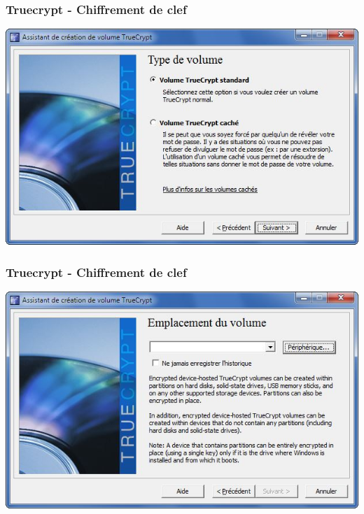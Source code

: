 \documentclass{beamer}
\begin{document}
\begin{frame}
\frametitle{Truecrypt - Chiffrement de clef}
\begin{center}
\includegraphics[scale=0.5] {./images/Truecrypt24.jpg} 
\end{center}
\end{frame}
\begin{frame}
\frametitle{Truecrypt - Chiffrement de clef}
\begin{center}
\includegraphics[scale=0.5] {./images/Truecrypt25.jpg} 
\end{center}
\end{frame}
\end{document}

